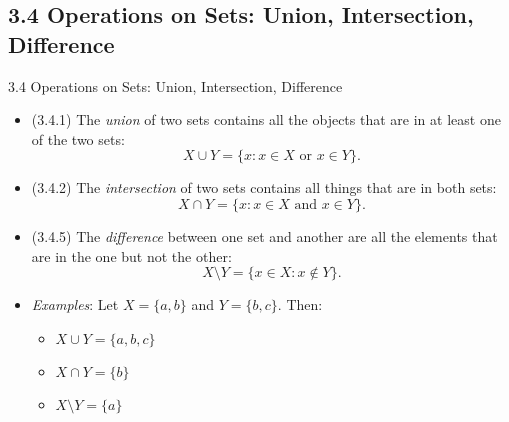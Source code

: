\subsection{3.4 Operations on Sets: Union, Intersection, Difference}
\begin{frame}{3.4 Operations on Sets: Union, Intersection, Difference}

	\begin{itemize}
	
		\item (3.4.1) The \emph{union} of two sets contains all the objects that are in at least one of the two sets:	
		\[X\cup Y=\{x: x\in X\text{ or }x\in Y\}.\]
		
		
		\item (3.4.2) The \emph{intersection} of two sets contains all things that are in both sets:
		 \[X\cap Y=\{x:x\in X\text{ and }x\in Y\}.\]
	
		\item (3.4.5) The \emph{difference} between one set and another are all the elements that are in the one but not the other: \[X\setminus Y=\{x\in X:x\notin Y\}.\]
		
		\item \emph{Examples}: Let $X=\{a,b\}$ and $Y=\{b,c\}$. Then:
		
		\begin{itemize}
		
			\item $X\cup Y=\{a,b,c\}$
			
			\item $X\cap Y=\{b\}$
			
			\item $X\setminus Y=\{a\}$
		
		\end{itemize}
	
	\end{itemize}

\end{frame}

